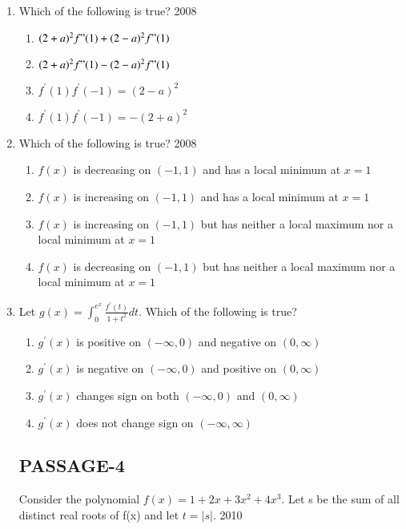 \documentclass[journal,12pt,onecolumn]{IEEEtran}
\theoremstyle{remark}
\begin{document}
\begin{enumerate}
 \item Which of the following is true?
\hfill{2008}
\begin{enumerate}
	\item $(2+a)^2 f"(1)+(2-a)^2 f"(1)$ 
    \item $(2+a)^2 f"(1)-(2-a)^2 f"(1)$
    \item $f^{\prime}(1)f^{\prime}(-1)=(2-a)^2$ 
    \item $f^{\prime}(1)f^{\prime}(-1)=-(2+a)^2$ 
\end{enumerate}
\item Which of the following is true?
\hfill{2008}
\begin{enumerate}
    \item $f(x)$ is decreasing on $(-1,1)$ and has a local minimum at $x=1$
    \item $f(x)$ is increasing on $(-1,1)$ and has a local minimum at $x=1$
    \item $f(x)$ is increasing on $(-1,1)$ but has neither a local maximum nor a local minimum at $x=1$
    \item $f(x)$ is decreasing on $(-1,1)$ but has neither a local maximum nor a local minimum at $x=1$
\end{enumerate}
\item Let $g(x)=\int_{0}^{e^x}\frac{f^{\prime}(t)}{1+t^2}dt$. Which of the following is true?
\begin{enumerate}
	\item $g^{\prime}(x)$ is positive on $(-\infty,0)$ and negative on $(0,\infty)$
	\item $g^{\prime}(x)$ is negative on $(-\infty,0)$ and positive on $(0,\infty)$
	\item $g^{\prime}(x)$ changes sign on both $(-\infty,0)$ and $(0,\infty)$
	\item $g^{\prime}(x)$ does not change sign on $(-\infty,\infty)$  
\end{enumerate}
\subsection{PASSAGE-4}

Consider the polynomial $f(x) = 1+2x+3x^2+4x^3$. Let s be the sum of all distinct real roots of f(x) and let $t=|s|$.
\hfill{2010}


\end{enumerate}
\end{document}
